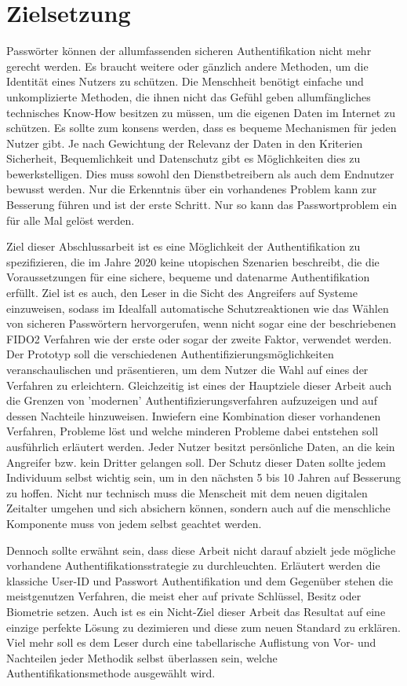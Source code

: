 \section{Zielsetzung}
Passwörter können der allumfassenden sicheren Authentifikation nicht mehr gerecht werden. Es braucht weitere oder gänzlich andere Methoden, um die Identität eines Nutzers zu schützen. Die Menschheit benötigt einfache und unkomplizierte Methoden, die ihnen nicht das Gefühl geben allumfängliches technisches Know-How besitzen zu müssen, um die eigenen Daten im Internet zu schützen. Es sollte zum konsens werden, dass es bequeme Mechanismen für jeden Nutzer gibt. Je nach Gewichtung der Relevanz der Daten in den Kriterien Sicherheit, Bequemlichkeit und Datenschutz gibt es Möglichkeiten dies zu bewerkstelligen. Dies muss sowohl den Dienstbetreibern als auch dem Endnutzer bewusst werden. Nur die Erkenntnis über ein vorhandenes Problem kann zur Besserung führen und ist der erste Schritt. Nur so kann das Passwortproblem ein für alle Mal gelöst werden.

Ziel dieser Abschlussarbeit ist es eine Möglichkeit der Authentifikation zu spezifizieren, die im Jahre 2020 keine utopischen Szenarien beschreibt, die die Voraussetzungen für eine sichere, bequeme und datenarme Authentifikation erfüllt. Ziel ist es auch, den Leser in die Sicht des Angreifers auf Systeme einzuweisen, sodass im Idealfall automatische Schutzreaktionen wie das Wählen von sicheren Passwörtern hervorgerufen, wenn nicht sogar eine der beschriebenen FIDO2 Verfahren wie der erste oder sogar der zweite Faktor, verwendet werden. Der Prototyp soll die verschiedenen Authentifizierungsmöglichkeiten veranschaulischen und präsentieren, um dem Nutzer die Wahl auf eines der Verfahren zu erleichtern. Gleichzeitig ist eines der Hauptziele dieser Arbeit auch die Grenzen von 'modernen' Authentifizierungsverfahren aufzuzeigen und auf dessen Nachteile hinzuweisen. Inwiefern eine Kombination dieser vorhandenen Verfahren, Probleme löst und welche minderen Probleme dabei entstehen soll ausführlich erläutert werden. Jeder Nutzer besitzt persönliche Daten, an die kein Angreifer bzw. kein Dritter gelangen soll. Der Schutz dieser Daten sollte jedem Individuum selbst wichtig sein, um in den nächsten 5 bis 10 Jahren auf Besserung zu hoffen. Nicht nur technisch muss die Menscheit mit dem neuen digitalen Zeitalter umgehen und sich absichern können, sondern auch auf die menschliche Komponente muss von jedem selbst geachtet werden.

Dennoch sollte erwähnt sein, dass diese Arbeit nicht darauf abzielt jede mögliche vorhandene Authentifikationsstrategie zu durchleuchten. Erläutert werden die klassiche User-ID und Passwort Authentifikation und dem Gegenüber stehen die meistgenutzen Verfahren, die meist eher auf private Schlüssel, Besitz oder Biometrie setzen. Auch ist es ein Nicht-Ziel dieser Arbeit das Resultat auf eine einzige perfekte Lösung zu dezimieren und diese zum neuen Standard zu erklären. Viel mehr soll es dem Leser durch eine tabellarische Auflistung von Vor- und Nachteilen jeder Methodik selbst überlassen sein, welche Authentifikationsmethode ausgewählt wird.
